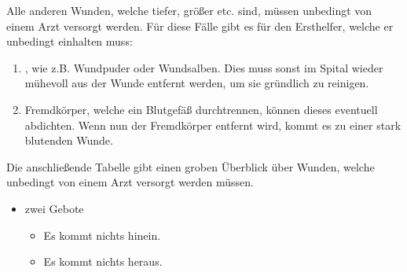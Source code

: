 {
Alle anderen Wunden, welche tiefer, größer etc. sind, müssen unbedingt von
einem Arzt versorgt werden. Für diese Fälle gibt es  für den
Ersthelfer, welche er unbedingt einhalten muss: 

\begin{enumerate}
    \item {}, wie z.B. Wundpuder oder Wundsalben. Dies muss sonst im
Spital wieder mühevoll aus der Wunde entfernt werden, um sie
gründlich zu reinigen.
\item {}
Fremdkörper, welche ein Blutgefäß durchtrennen, können dieses eventuell abdichten. Wenn nun der Fremdkörper entfernt wird, kommt es zu einer stark blutenden Wunde. 

\end{enumerate}
 Die anschließende
Tabelle gibt einen groben Überblick über Wunden, welche unbedingt von einem
Arzt versorgt werden müssen.
}{
\begin{itemize}
    \item zwei Gebote
    \begin{itemize}
        \item Es kommt nichts hinein.
        \item Es kommt nichts heraus.
    \end{itemize}
\end{itemize}
}{}{}{}

